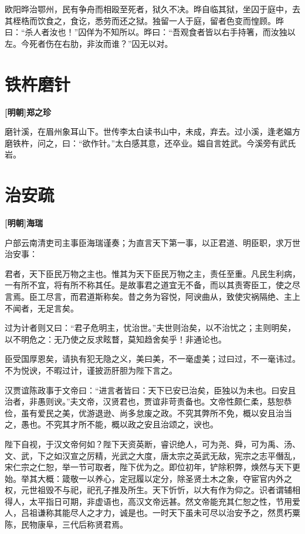 \documentclass[UTF8,titlepage,oneside]{ctexbook}
\begin{document}
欧阳晔治鄂州，民有争舟而相殴至死者，狱久不决。晔自临其狱，坐囚于庭中，去其桎梏而饮食之，食讫，悉劳而还之狱。独留一人于庭，留者色变而惶顾。晔曰：“杀人者汝也！”囚佯为不知所以。晔曰：“吾观食者皆以右手持箸，而汝独以左。今死者伤在右肋，非汝而谁？”囚无以对。


\chapter*{铁杵磨针}
\begin{center}
	\textbf{[明朝]郑之珍}
\end{center}

磨针溪，在眉州象耳山下。世传李太白读书山中，未成，弃去。过小溪，逢老媪方磨铁杵，问之，曰：“欲作针。”太白感其意，还卒业。媪自言姓武。今溪旁有武氏岩。


\chapter*{治安疏}
\begin{center}
	\textbf{[明朝]海瑞}
\end{center}

户部云南清吏司主事臣海瑞谨奏；为直言天下第一事，以正君道、明臣职，求万世治安事：

君者，天下臣民万物之主也。惟其为天下臣民万物之主，责任至重。凡民生利病，一有所不宜，将有所不称其任。是故事君之道宜无不备，而以其责寄臣工，使之尽言焉。臣工尽言，而君道斯称矣。昔之务为容悦，阿谀曲从，致使灾祸隔绝、主上不闻者，无足言矣。

过为计者则又曰：“君子危明主，忧治世。”夫世则治矣，以不治忧之；主则明矣，以不明危之：无乃使之反求眩瞀，莫知趋舍矣乎！非通论也。

臣受国厚恩矣，请执有犯无隐之义，美曰美，不一毫虚美；过曰过，不一毫讳过。不为悦谀，不暇过计，谨披沥肝胆为陛下言之。

汉贾谊陈政事于文帝曰：“进言者皆曰：天下已安已治矣，臣独以为未也。曰安且治者，非愚则谀。”夫文帝，汉贤君也，贾谊非苛责备也。文帝性颇仁柔，慈恕恭俭，虽有爱民之美，优游退逊、尚多怠废之政。不究其弊所不免，概以安且治当之，愚也。不究其才所不能，概以政之安且治颂之，谀也。

陛下自视，于汉文帝何如？陛下天资英断，睿识绝人，可为尧、舜，可为禹、汤、文、武，下之如汉宣之厉精，光武之大度，唐太宗之英武无敌，宪宗之志平僭乱，宋仁宗之仁恕，举一节可取者，陛下优为之。即位初年，铲除积弊，焕然与天下更始。举其大概：箴敬一以养心，定冠履以定分，除圣贤土木之象，夺宦官内外之权，元世祖毁不与祀，祀孔子推及所生。天下忻忻，以大有作为仰之。识者谓辅相得人，太平指日可期，非虚语也，高汉文帝远甚。然文帝能充其仁恕之性，节用爱人，吕祖谦称其能尽人之才力，诚是也。一时天下虽未可尽以治安予之，然贯朽粟陈，民物康阜，三代后称贤君焉。
\end{document}
